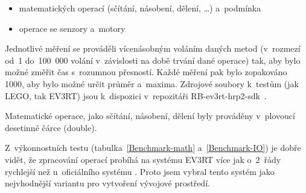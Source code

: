 \begin{itemize}
    \item matematických operací (sčítání, násobení, dělení, \dots) a~podmínka
    \item operace se senzory a~motory
\end{itemize}

Jednotlivé měření se prováděli vícenásobným voláním daných metod (v~rozmezí od~1 do~100~000 volání v~závislosti na době trvání dané operace) tak, aby bylo možné změřit čas s~rozumnou přesností.
Každé měření pak bylo zopakováno 1000, aby bylo možné určit průměr a~maxima. 
Zdrojové soubory k~testům (jak LEGO, tak EV3RT) jsou k~dispozici v~repozitáři RB-ev3rt-hrp2-sdk~\cite{RB-ev3rt-hrp2-sdk-github}.

Matematické operace, jako sčítání, násobení, dělení byly prováděny v~plovoucí desetinné čárce (double).

Z~výkonnostních testu (tabulka~\ref{Benchmark-math} a~\ref{Benchmark-IO}) je dobře vidět, že zpracování operací probíhá na systému EV3RT více jak o~2~řády rychlejší než u~oficiálního systému \EVthree{}. Proto jsem vybral tento systém jako nejvhodnější variantu pro  vytvoření vývojové prostředí.

